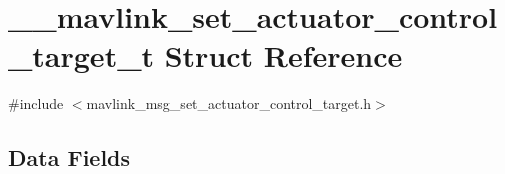 \hypertarget{struct____mavlink__set__actuator__control__target__t}{\section{\+\_\+\+\_\+mavlink\+\_\+set\+\_\+actuator\+\_\+control\+\_\+target\+\_\+t Struct Reference}
\label{struct____mavlink__set__actuator__control__target__t}
}


{\ttfamily \#include $<$mavlink\+\_\+msg\+\_\+set\+\_\+actuator\+\_\+control\+\_\+target.\+h$>$}

\subsection*{Data Fields}
